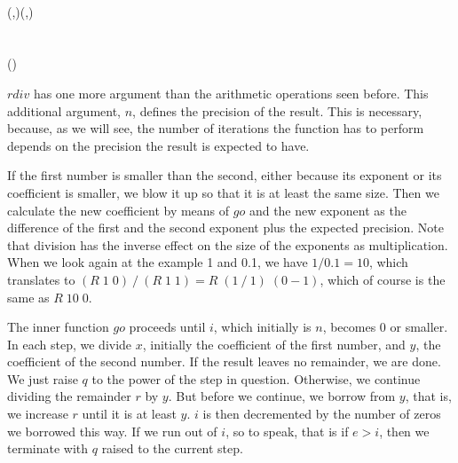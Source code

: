 \documentclass[tikz]{scrreprt}
\newcommand{\Conid}[1]{\mathit{#1}}
\newcommand{\Varid}[1]{\mathit{#1}}
\def\resethooks{%
  \global\let\SaveRestoreHook\empty
  \global\let\ColumnHook\empty}
\newcommand{\hsindent}[1]{\quad}%
\begin{document}
\begin{minipage}{\textwidth}
\begin{pboxed}
\\
\>[25]{}\hsindent{1}{}\<[26]%
\>[26]{}(\Varid{q},\Varid{r})\to {}\;{}\<[40]%
\>[40]{}(\Varid{r'},\Varid{e}){}\<[48]%
\>[48]{}\mathrel{=}\Varid{borrow}\;\Varid{r}\;\Varid{y}{}\<[E]%
\\
\>[40]{}\Varid{q'}{}\<[48]%
\>[48]{}\mathrel{=}\mathbin{\uparrow}\Varid{i}\mathbin{*}\Varid{q}{}\<[E]%
\\
\>[26]{}\hsindent{9}{}\<[35]%
\>[35]{}\;\;\Varid{e}\mathbin{>}\Varid{i}\;{}\<[48]%
\>[48]{}\;\Varid{q'}{}\<[E]%
\\
\>[48]{}\;\Varid{q'}\mathbin{+}\Varid{go}\;(\Varid{i}\mathbin{-}\Varid{e})\;\Varid{r'}\;\Varid{y}{}\<[E]%
\ColumnHook
\end{pboxed}
\)\par\noindent\endgroup\resethooks
\end{minipage}

\ensuremath{\Varid{rdiv}} has one more argument 
than the arithmetic operations seen before.
This additional argument, $n$, defines the
precision of the result.
This is necessary, because, as we will see,
the number of iterations
the function has to perform depends on the
precision the result is expected to have.

If the first number is smaller than the second,
either because its exponent or its
coefficient is smaller, we blow it up
so that it is at least the same size.
Then we calculate the new coefficient
by means of \ensuremath{\Varid{go}} and the new exponent as
the difference of the first and the second exponent
plus the expected precision.
Note that division has the inverse effect on the size
of the exponents as multiplication.
When we look again at the example 1 and 0.1,
we have $1 / 0.1 = 10$, which translates to
\ensuremath{(\Conid{R}\;\mathrm{1}\;\mathrm{0})\mathbin{/}(\Conid{R}\;\mathrm{1}\;\mathrm{1})\mathrel{=}\Conid{R}\;(\mathrm{1}\mathbin{/}\mathrm{1})\;(\mathrm{0}\mathbin{-}\mathrm{1})}, which
of course is the same as \ensuremath{\Conid{R}\;\mathrm{10}\;\mathrm{0}}.

The inner function \ensuremath{\Varid{go}} proceeds until \ensuremath{\Varid{i}},
which initially is \ensuremath{\Varid{n}}, becomes 0 or smaller.
In each step, we divide \ensuremath{\Varid{x}}, initially the coefficient
of the first number, and \ensuremath{\Varid{y}}, the coefficient of the
second number. If the result leaves no remainder,
we are done. We just raise \ensuremath{\Varid{q}} to the power of 
the step in question. Otherwise, we continue
dividing the remainder \ensuremath{\Varid{r}} by \ensuremath{\Varid{y}}. But before
we continue, we borrow from \ensuremath{\Varid{y}}, that is,
we increase \ensuremath{\Varid{r}} until it is at least \ensuremath{\Varid{y}}.
\ensuremath{\Varid{i}} is then decremented by the number of zeros
we borrowed this way.
If we run out of \ensuremath{\Varid{i}}, so to speak, that is
if $e > i$, then we terminate with \ensuremath{\Varid{q}} raised
to the current step.
\end{document}

